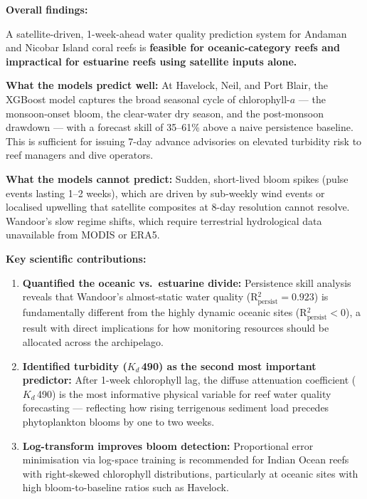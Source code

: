 \documentclass[12pt,a4paper]{report}
\begin{document}
\begin{findingbox}
\textbf{Overall findings:}

A satellite-driven, 1-week-ahead water quality prediction system for Andaman and
Nicobar Island coral reefs is \textbf{feasible for oceanic-category reefs and impractical
for estuarine reefs using satellite inputs alone.}

\vspace{6pt}
\textbf{What the models predict well:} At Havelock, Neil, and Port Blair, the
XGBoost model captures the broad seasonal cycle of chlorophyll-$a$ --- the
monsoon-onset bloom, the clear-water dry season, and the post-monsoon drawdown ---
with a forecast skill of 35--61\% above a naive persistence baseline. This is
sufficient for issuing 7-day advance advisories on elevated turbidity risk to reef
managers and dive operators.

\vspace{6pt}
\textbf{What the models cannot predict:} Sudden, short-lived bloom spikes (pulse events
lasting 1--2 weeks), which are driven by sub-weekly wind events or localised upwelling
that satellite composites at 8-day resolution cannot resolve. Wandoor's slow regime
shifts, which require terrestrial hydrological data unavailable from MODIS or ERA5.

\vspace{6pt}
\textbf{Key scientific contributions:}
\begin{enumerate}[leftmargin=*, nosep]
  \item \textbf{Quantified the oceanic vs.\ estuarine divide:} Persistence skill
  analysis reveals that Wandoor's almost-static water quality (R$^2_{\text{persist}} =
  0.923$) is fundamentally different from the highly dynamic oceanic sites
  (R$^2_{\text{persist}} < 0$), a result with direct implications for how monitoring
  resources should be allocated across the archipelago.
  \item \textbf{Identified turbidity ($K_d$\,490) as the second most important predictor:}
  After 1-week chlorophyll lag, the diffuse attenuation coefficient ($K_d$\,490) is
  the most informative physical variable for reef water quality forecasting —
  reflecting how rising terrigenous sediment load precedes phytoplankton blooms by
  one to two weeks.
  \item \textbf{Log-transform improves bloom detection:} Proportional error minimisation
  via log-space training is recommended for Indian Ocean reefs with right-skewed
  chlorophyll distributions, particularly at oceanic sites with high bloom-to-baseline
  ratios such as Havelock.
\end{enumerate}


\end{findingbox}
\end{document}
